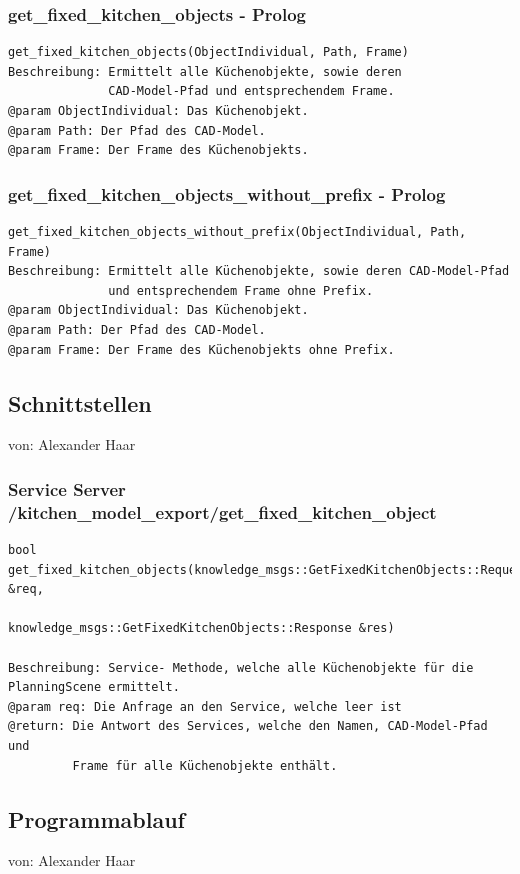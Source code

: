 \documentclass{suturo}
\makeatletter
\newcommand{\chapterauthor}[1]{%
  {\parindent0pt\vspace*{-27pt}%
  \linespread{0}\small\begin{flushright}von: #1\end{flushright}%
  \par\nobreak\vspace*{0pt}}
  \@afterheading%
}
\makeatother
\begin{document}
\subsubsection{get\_fixed\_kitchen\_objects - Prolog}
\begin{verbatim}
get_fixed_kitchen_objects(ObjectIndividual, Path, Frame)
Beschreibung: Ermittelt alle Küchenobjekte, sowie deren 
              CAD-Model-Pfad und entsprechendem Frame.
@param ObjectIndividual: Das Küchenobjekt.
@param Path: Der Pfad des CAD-Model.
@param Frame: Der Frame des Küchenobjekts.
\end{verbatim}

\subsubsection{get\_fixed\_kitchen\_objects\_without\_prefix - Prolog}
\begin{verbatim}
get_fixed_kitchen_objects_without_prefix(ObjectIndividual, Path, Frame) 
Beschreibung: Ermittelt alle Küchenobjekte, sowie deren CAD-Model-Pfad 
              und entsprechendem Frame ohne Prefix.
@param ObjectIndividual: Das Küchenobjekt.
@param Path: Der Pfad des CAD-Model.
@param Frame: Der Frame des Küchenobjekts ohne Prefix.
\end{verbatim}

\subsection{Schnittstellen}
\chapterauthor{Alexander Haar}

\subsubsection{Service Server /kitchen\_model\_export/get\_fixed\_kitchen\_object}
\begin{verbatim}
bool get_fixed_kitchen_objects(knowledge_msgs::GetFixedKitchenObjects::Request  &req,
                               knowledge_msgs::GetFixedKitchenObjects::Response &res)

Beschreibung: Service- Methode, welche alle Küchenobjekte für die PlanningScene ermittelt.
@param req: Die Anfrage an den Service, welche leer ist
@return: Die Antwort des Services, welche den Namen, CAD-Model-Pfad und 
         Frame für alle Küchenobjekte enthält.

\end{verbatim}


\subsection{Programmablauf}
\chapterauthor{Alexander Haar}
\end{document}
